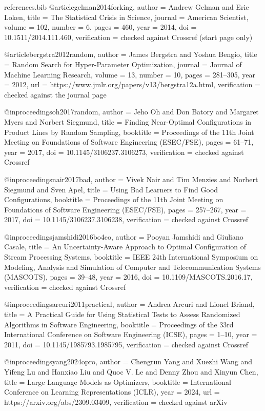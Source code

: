 \begin{filecontents*}[overwrite]{references.bib}
@article{gelman2014forking,
  author = {Andrew Gelman and Eric Loken},
  title = {The Statistical Crisis in Science},
  journal = {American Scientist},
  volume = {102},
  number = {6},
  pages = {460},
  year = {2014},
  doi = {10.1511/2014.111.460},
  verification = {checked against Crossref (start page only)}
}

@article{bergstra2012random,
  author = {James Bergstra and Yoshua Bengio},
  title = {Random Search for Hyper-Parameter Optimization},
  journal = {Journal of Machine Learning Research},
  volume = {13},
  number = {10},
  pages = {281--305},
  year = {2012},
  url = {https://www.jmlr.org/papers/v13/bergstra12a.html},
  verification = {checked against the journal page}
}

@inproceedings{oh2017random,
  author = {Jeho Oh and Don Batory and Margaret Myers and Norbert Siegmund},
  title = {Finding Near-Optimal Configurations in Product Lines by Random Sampling},
  booktitle = {Proceedings of the 11th Joint Meeting on Foundations of Software Engineering (ESEC/FSE)},
  pages = {61--71},
  year = {2017},
  doi = {10.1145/3106237.3106273},
  verification = {checked against Crossref}
}

@inproceedings{nair2017bad,
  author = {Vivek Nair and Tim Menzies and Norbert Siegmund and Sven Apel},
  title = {Using Bad Learners to Find Good Configurations},
  booktitle = {Proceedings of the 11th Joint Meeting on Foundations of Software Engineering (ESEC/FSE)},
  pages = {257--267},
  year = {2017},
  doi = {10.1145/3106237.3106238},
  verification = {checked against Crossref}
}

@inproceedings{jamshidi2016bo4co,
  author = {Pooyan Jamshidi and Giuliano Casale},
  title = {An Uncertainty-Aware Approach to Optimal Configuration of Stream Processing Systems},
  booktitle = {IEEE 24th International Symposium on Modeling, Analysis and Simulation of Computer and Telecommunication Systems (MASCOTS)},
  pages = {39--48},
  year = {2016},
  doi = {10.1109/MASCOTS.2016.17},
  verification = {checked against Crossref}
}

@inproceedings{arcuri2011practical,
  author = {Andrea Arcuri and Lionel Briand},
  title = {A Practical Guide for Using Statistical Tests to Assess Randomized Algorithms in Software Engineering},
  booktitle = {Proceedings of the 33rd International Conference on Software Engineering (ICSE)},
  pages = {1--10},
  year = {2011},
  doi = {10.1145/1985793.1985795},
  verification = {checked against Crossref}
}

@inproceedings{yang2024opro,
  author = {Chengrun Yang and Xuezhi Wang and Yifeng Lu and Hanxiao Liu and Quoc V. Le and Denny Zhou and Xinyun Chen},
  title = {Large Language Models as Optimizers},
  booktitle = {International Conference on Learning Representations (ICLR)},
  year = {2024},
  url = {https://arxiv.org/abs/2309.03409},
  verification = {checked against arXiv}
}


\end{filecontents*}
